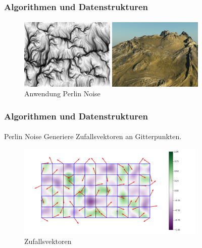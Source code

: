 \documentclass{beamer}
\begin{document}
\begin{frame}
    \frametitle{Algorithmen und Datenstrukturen}
\framesubtitle{}
\begin{figure}[H]
    \includegraphics[width=0.4\textwidth]{images/perlinnoisepattern.png}
    \caption{Anwenung Perlin Noise}
    \includegraphics[width=0.4\textwidth]{images/terrain.png}
    \caption{Anwendung Perlin Noise}
\end{figure}
\end{frame}



\begin{frame}
    \frametitle{Algorithmen und Datenstrukturen}
\framesubtitle{}
\begin{block}{Perlin Noise}
Generiere Zufallsvektoren an Gitterpunkten.
\end{block}
\begin{figure}[H]
    \centering
    \includegraphics[width=0.8\textwidth]{images/perlinNoiseNV.png}
    \caption{Zufallsvektoren}
\end{figure}
\end{frame}
\end{document}
